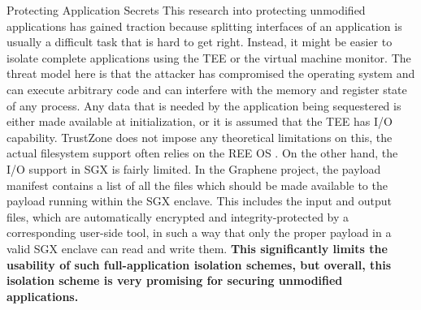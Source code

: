\begin{subsection}{Protecting Application Secrets}
This research into protecting unmodified applications has gained traction
because splitting interfaces of an application is usually a difficult task
that is hard to get right. Instead, it might be easier to isolate complete
applications using the TEE or the virtual machine monitor. The threat model
here is that the attacker has compromised the operating system and can
execute arbitrary code and can interfere with the memory and register state
of any process. Any data that is needed by the application being sequestered
is either made available at initialization, or it is assumed that the TEE
has I/O capability. TrustZone does not impose any theoretical limitations on
this, the actual filesystem support often relies on the REE OS
\cite{optee_filesystem}. On the other hand, the I/O support in SGX is fairly
limited. In the Graphene project\cite{TsaiGraphene2014, tsai2017graphene},
the payload manifest contains a list of all the files which should be made
available to the payload running within the SGX enclave. This includes the
input and output files, which are automatically encrypted and
integrity-protected by a corresponding user-side tool, in such a way that
only the proper payload in a valid SGX enclave can read and write them.
\textbf{This significantly limits the usability of such full-application
isolation schemes, but overall, this isolation scheme is very promising for
securing unmodified applications.}
    
   
\end{subsection}

